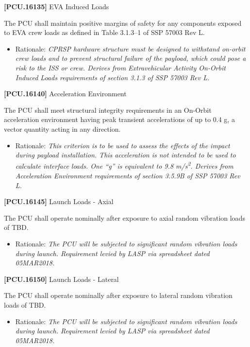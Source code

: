 \documentclass[12pt,oneside,oldfontcommands]{memoir}
\begin{document}
\textbf{[PCU.16135]} EVA Induced Loads

The \gls{PCU} shall maintain positive margins of safety for any components exposed to EVA crew loads as defined in Table 3.1.3--1 of SSP 57003 Rev L.

\begin{itemize}
\item{} Rationale: \emph{CPRSP hardware structure must be designed to withstand on-orbit crew loads and to prevent structural failure of the payload, which could pose a risk to the ISS or crew. Derives from Extravehicular Activity On-Orbit Induced Loads requirements of section 3.1.3 of SSP 57003 Rev L.}

\end{itemize}

\textbf{[PCU.16140]} Acceleration Environment

The \gls{PCU} shall meet structural integrity requirements in an On-Orbit acceleration environment having peak transient accelerations of up to 0.4 g, a vector quantity acting in any direction.

\begin{itemize}
\item{} Rationale: \emph{This criterion is to be used to assess the effects of the impact during payload installation. This acceleration is not intended to be used to calculate interface loads. One ``g'' is equivalent to 9.8 m\slash s\textsuperscript{2}. Derives from Acceleration Environment requirements of section 3.5.9B of SSP 57003 Rev L.}

\end{itemize}

\textbf{[PCU.16145]} Launch Loads - Axial

The \gls{PCU} shall operate nominally after exposure to axial random vibration loads of TBD\label{tbx_14}.

\begin{itemize}
\item{} Rationale: \emph{The PCU will be subjected to significant random vibration loads during launch. Requirement levied by LASP via spreadsheet dated 05MAR2018.}

\end{itemize}

\textbf{[PCU.16150]} Launch Loads - Lateral

The \gls{PCU} shall operate nominally after exposure to lateral random vibration loads of TBD\label{tbx_15}.

\begin{itemize}
\item{} Rationale: \emph{The PCU will be subjected to significant random vibration loads during launch. Requirement levied by LASP via spreadsheet dated 05MAR2018.}

\end{itemize}
\end{document}
